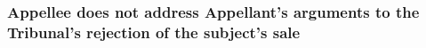 \documentclass[12pt,\documentclassflag]{michiganCourtOfAppealsBrief}
\begin{document}





\subsubsection{Appellee does not address Appellant's arguments to the Tribunal's rejection of the subject's sale}
\end{document}
